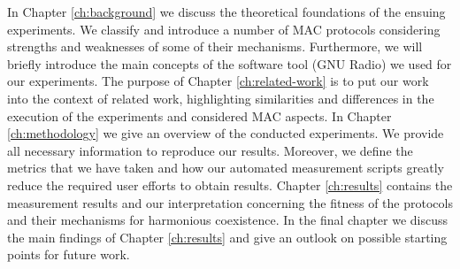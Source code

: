 In Chapter \ref{ch:background} we discuss the theoretical foundations of the ensuing experiments. We classify and introduce a number of MAC protocols considering strengths and weaknesses of some of their mechanisms. Furthermore, we will briefly introduce the main concepts of the software tool (GNU Radio) we used for our experiments. The purpose of Chapter \ref{ch:related-work} is to put our work into the context of related work, highlighting similarities and differences in the execution of the experiments and considered MAC aspects.
In Chapter \ref{ch:methodology} we give an overview of the conducted experiments. We provide all necessary information to reproduce our results. Moreover, we define the metrics that we have taken and how our automated measurement scripts greatly reduce the required user efforts to obtain results.
Chapter \ref{ch:results} contains the measurement results and our interpretation concerning the fitness of the protocols and their mechanisms for harmonious coexistence. 
In the final chapter we discuss the main findings of Chapter \ref{ch:results} and give an outlook on possible starting points for future work.